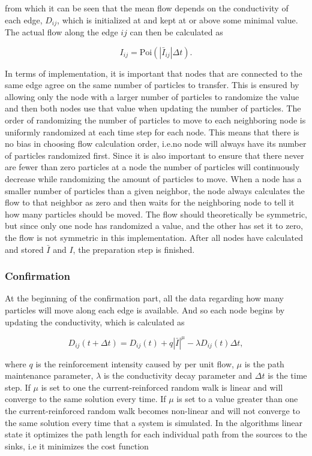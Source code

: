  \noindent from which it can be seen that the mean flow depends on the conductivity of each edge, $D_{ij}$, which is 	initialized at and kept at or above some minimal value. The actual flow along the edge $ij$ can then be calculated as

\begin{equation}
I_{ij} = \text{Poi}(|\bar{I}_{ij}|\Delta t).
\end{equation}

In terms of implementation, it is important that nodes that are connected to the same edge agree on the same number of particles to transfer. This is ensured by allowing only the node with a larger number of particles to randomize the value and then both nodes use that value when updating the number of particles. The order of randomizing the number of particles to move to each neighboring node is uniformly randomized at each time step for each node. This means that there is no bias in choosing flow calculation order, i.e.\@ no node will always have its number of particles randomized first. Since it is also important to ensure that there never are fewer than zero particles at a node the number of particles will continuously decrease while randomizing the amount of particles to move. When a node has a smaller number of particles than a given neighbor, the node always calculates the flow to that neighbor as zero and then waits for the neighboring node to tell it how many particles should be moved. The flow should theoretically be symmetric, but since only one node has randomized a value, and the other has set it to zero, the flow is not symmetric in this implementation. After all nodes have calculated and stored $\bar{I}$ and $I$, the preparation step is finished.

\subsubsection{Confirmation}
\label{sec:confirmation}
At the beginning of the confirmation part, all the data regarding how many particles will move along each edge is available. And so each node begins by updating the conductivity, which is calculated as

\begin{equation}
D_{ij}(t + \Delta t) = D_{ij}(t) + q|\bar{I}|^\mu - \lambda D_{ij}(t)\Delta t,
\end{equation}

 \noindent where $q$ is the reinforcement intensity caused by per unit flow, $\mu$ is the path maintenance parameter, $\lambda$ is the conductivity decay parameter and $\Delta t$ is the time step. If $\mu$ is set to one the current-reinforced random walk is linear and will converge to the same solution every time. If $\mu$ is set to a value greater than one the current-reinforced random walk becomes non-linear and will not converge to the same solution every time that a system is simulated. In the algorithms linear state it optimizes the path length for each individual path from the sources to the sinks, i.e it minimizes the cost function

